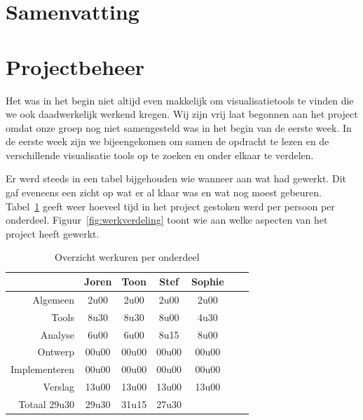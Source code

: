 \documentclass[i1]{oss}
\begin{document}
\section{Samenvatting}

\section{Projectbeheer}

Het was in het begin niet altijd even makkelijk om visualisatietools te vinden die we ook daadwerkelijk werkend kregen.
Wij zijn vrij laat begonnen aan het project omdat onze groep nog niet samengesteld was in het begin van de eerste week. In de eerste week zijn we bijeengekomen om samen de opdracht te lezen en de verschillende visualisatie tools op te zoeken en onder elkaar te verdelen. 

Er werd steeds in een tabel bijgehouden wie wanneer aan wat had gewerkt. Dit gaf eveneens een zicht op wat er al klaar was en wat nog moest gebeuren. \\
Tabel~\ref{tab:werkuren} geeft weer hoeveel tijd in het project gestoken werd per persoon per onderdeel. Figuur~\ref{fig:werkverdeling} toont wie aan welke aspecten van het project heeft gewerkt.

\begin{table}[h]
\begin{center}
    \begin{tabular}{ r | c  c  c  c  c  c}
     & Joren & Toon & Stef & Sophie \\ \hline
    Algemeen & 2u00 & 2u00 & 2u00 & 2u00\\
   	Tools & 8u30 & 8u30 & 8u00 & 4u30 \\
	Analyse & 6u00 & 6u00 & 8u15 & 8u00 \\
	Ontwerp & 00u00 & 00u00 & 00u00 & 00u00 \\
	Implementeren & 00u00 & 00u00 & 00u00 & 00u00\\
	Verslag & 13u00 & 13u00 & 13u00 & 13u00 \\
	Totaal 29u30 & 29u30 & 31u15 & 27u30  
    \end{tabular}
    \caption{Overzicht werkuren per onderdeel}
    \label{tab:werkuren}
\end{center}
\end{table}
\end{document}

